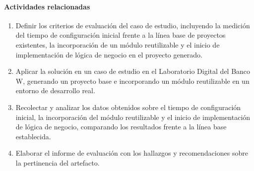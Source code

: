 \paragraph*{Actividades relacionadas}

\begin{enumerate}
    \item Definir los criterios de evaluación del caso de estudio, incluyendo la medición del tiempo de configuración inicial frente a la línea base de proyectos existentes, la incorporación de un módulo reutilizable y el inicio de implementación de lógica de negocio en el proyecto generado.
    
    \item Aplicar la solución en un caso de estudio en el Laboratorio Digital del Banco W, generando un proyecto base e incorporando un módulo reutilizable en un entorno de desarrollo real.
    
    \item Recolectar y analizar los datos obtenidos sobre el tiempo de configuración inicial, la incorporación del módulo reutilizable y el inicio de implementación de lógica de negocio, comparando los resultados frente a la línea base establecida.
    
    \item Elaborar el informe de evaluación con los hallazgos y recomendaciones sobre la pertinencia del artefacto.
\end{enumerate}